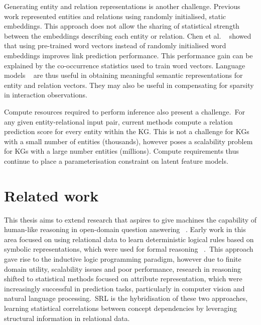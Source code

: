 \noindent Generating entity and relation representations is another challenge. Previous work represented entities and relations using randomly initialised, static embeddings. This approach does not allow the sharing of statistical strength between the embeddings describing each entity or relation. Chen et al. \unskip~\citep{socher2013reasoning} showed that using pre-trained word vectors instead of randomly initialised word embeddings improves link prediction performance. This performance gain can be explained by the co-occurrence statistics used to train word vectors. Language models \unskip~\citep{bojanowski2017enriching, vaswani2017attention} are thus useful in obtaining meaningful semantic representations for entity and relation vectors. They may also be useful in compensating for sparsity in interaction observations. \par

\noindent Compute resources required to perform inference also present a challenge.\ For any given entity-relational input pair, current methods compute a relation prediction score for every entity within the KG. This is not a challenge for KGs with a small number of entities (thousands), however poses a scalability problem for KGs with a large number entities (millions). Compute requirements thus continue to place a parameterisation constraint on latent feature models. 



\section{Related work} %

\noindent This thesis aims to extend research that aspires to give machines the capability of human-like reasoning in open-domain question answering \unskip~\citep{hakimov2019evaluating}. Early work in this area focused on using relational data to learn deterministic logical rules based on symbolic representations, which were used for formal reasoning \unskip~\citep{hohenecker2017deep}.\ This approach gave rise to the inductive logic programming paradigm, however due to finite domain utility, scalability issues and poor performance, research in reasoning shifted to statistical methods focused on attribute representation, which were increasingly successful in prediction tasks, particularly in computer vision and natural language processing.\ SRL is the hybridisation of these two approaches, learning statistical correlations between concept dependencies by leveraging structural information in relational data. \par

